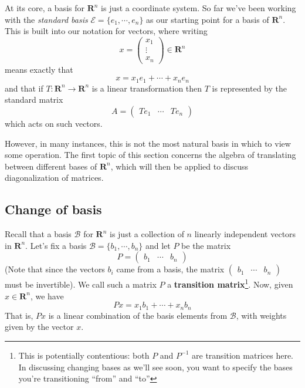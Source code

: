 \documentclass[12pt]{article}
\numberwithin{equation}{subsection}
\numberwithin{figure}{subsection}
\theoremstyle{note}
\newcommand{\R}{\mathbf{R}}
\begin{document}
At its core, a basis for $\R^n$ is just a coordinate system. So far we've been working with the \textit{standard basis} $\mathcal{E}=\{e_1,\cdots,e_n\}$ as our starting point for a basis of $\R^n$. This is built into our notation for vectors, where writing \[x= \begin{pmatrix} x_1 \\ \vdots\\x_n\end{pmatrix} \in \R^n\] means exactly that \[x=x_1e_1+\cdots+x_ne_n\] and that if $T\colon \R^n\to\R^n$ is a linear transformation then $T$ is represented by the standard matrix \[ A=\begin{pmatrix} Te_1 & \cdots & Te_n\end{pmatrix}\] which acts on such vectors. 

However, in many instances, this is not the most natural basis in which to view some operation. The first topic of this section concerns the algebra of translating between different bases of $\R^n$, which will then be applied to discuss diagonalization of matrices. 

\subsection{Change of basis}
 Recall that a basis $\mathcal{B}$ for $\R^n$ is just a collection of $n$ linearly independent vectors in $\R^n$. Let's fix a basis $\mathcal{B}=\{b_1,\cdots,b_n\}$ and let $P$ be the matrix \[ P=\begin{pmatrix} b_1  & \cdots & b_n\end{pmatrix}\] (Note that since the vectors $b_i$ came from a basis, the matrix $\begin{pmatrix} b_1 & \cdots & b_n \end{pmatrix}$ must be invertible). 
 We call such a matrix $P$ a \textbf{transition matrix}\footnote{This is potentially contentious: both $P$ and $P^{-1}$ are transition matrices here. In discussing changing bases as we'll see soon, you want to specify the bases you're transitioning ``from'' and ``to'' }. Now, given $x\in \R^n$, we have \[ Px=x_1b_1 +\cdots +x_nb_n\] That is, $Px$ is a linear combination of the basis elements from $\mathcal{B}$, with weights given by the vector $x$. 
\end{document}
